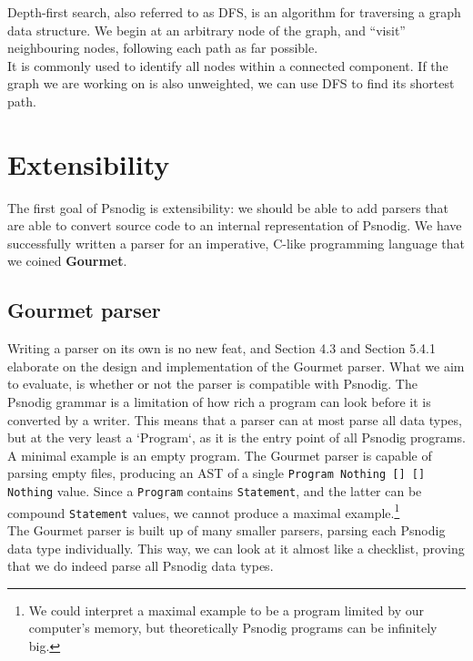 Depth-first search, also referred to as DFS, is an algorithm for traversing a graph data structure. We begin at an arbitrary node of the graph, and ``visit'' neighbouring nodes, following each path as far possible. \\

It is commonly used to identify all nodes within a connected component. If the graph we are working on is also unweighted, we can use DFS to find its shortest path.

\section{Extensibility}

The first goal of Psnodig is extensibility: we should be able to add parsers that are able to convert source code to an internal representation of Psnodig. We have successfully written a parser for an imperative, C-like programming language that we coined \textbf{Gourmet}.

\subsection{Gourmet parser}

Writing a parser on its own is no new feat, and Section 4.3 and Section 5.4.1 elaborate on the design and implementation of the Gourmet parser. What we aim to evaluate, is whether or not the parser is compatible with Psnodig. The Psnodig grammar is a limitation of how rich a program can look before it is converted by a writer. This means that a parser can at most parse all data types, but at the very least a `Program`, as it is the entry point of all Psnodig programs. \\

A minimal example is an empty program. The Gourmet parser is capable of parsing empty files, producing an AST of a single \texttt{Program Nothing [] [] Nothing} value. Since a \texttt{Program} contains \texttt{Statement}, and the latter can be compound \texttt{Statement} values, we cannot produce a maximal example.\footnote{We could interpret a maximal example to be a program limited by our computer’s memory, but theoretically Psnodig programs can be infinitely big.} \\

The Gourmet parser is built up of many smaller parsers, parsing each Psnodig data type individually. This way, we can look at it almost like a checklist, proving that we do indeed parse all Psnodig data types. \\

